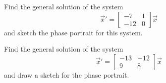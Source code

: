 \begin{exercise}\ansMark%
Find the general solution of the system
\begin{equation*}
{\vec{x}}' = \begin{bmatrix} -7 & 1 \\ -12 & 0 \end{bmatrix} \vec{x}
\end{equation*}
and sketch the phase portrait for this system.
\end{exercise}
%

\begin{exercise}\ansMark%
Find the general solution of the system
\begin{equation*}
{\vec{x}}' = \begin{bmatrix} -13 & -12 \\ 9 & 8 \end{bmatrix} \vec{x}
\end{equation*}
and draw a sketch for the phase portrait.
\end{exercise}
%

